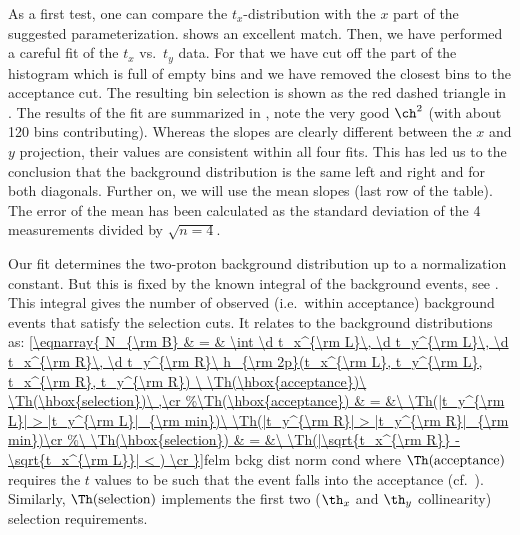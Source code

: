 As a first test, one can compare the $t_x$-distribution with the $x$ part of the suggested parameterization.  shows an excellent match. Then, we have performed a careful fit of the $t_x$ vs.~$t_y$ data. For that we have cut off the part of the histogram which is full of empty bins and we have removed the closest bins to the acceptance cut. The resulting bin selection is shown as the red dashed triangle in . The results of the fit are summarized in , note the very good $\ch^2$ (with about 120 bins contributing). Whereas the slopes are clearly different between the $x$ and $y$ projection, their values are consistent within all four fits. This has led us to the conclusion that the background distribution is the same left and right and for both diagonals. Further on, we will use the mean slopes (last row of the table). The error of the mean has been calculated as the standard deviation of the 4 measurements divided by $\sqrt{n = 4}$.

\eject %



Our fit  determines the two-proton background distribution  up to a normalization constant. But this is fixed by the known integral of the background events, see . This integral gives the number of observed (i.e.~within acceptance) background events that satisfy the selection cuts. It relates to the background distributions as:
\eqref{\eqnarray{
N_{\rm B} & = & \int \d t_x^{\rm L}\, \d t_y^{\rm L}\, \d t_x^{\rm R}\, \d t_y^{\rm R}\ h_{\rm 2p}(t_x^{\rm L}, t_y^{\rm L}, t_x^{\rm R}, t_y^{\rm R})
	\ \Th(\hbox{acceptance})\ \Th(\hbox{selection})\ ,\cr
}}{felm bckg dist norm cond}
where $\Th(\hbox{acceptance})$ requires the $t$ values to be such that the event falls into the acceptance (cf.~). Similarly, $\Th(\hbox{selection})$ implements the first two ($\th_x$ and $\th_y$ collinearity) selection requirements.

